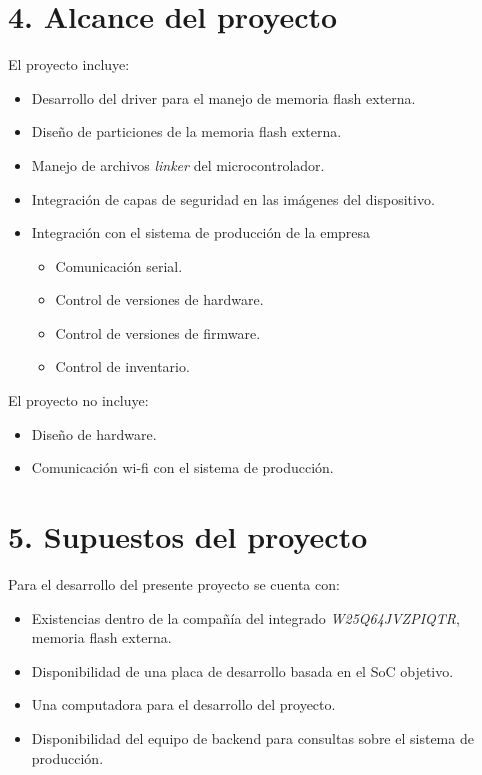 \documentclass[
11pt, %
]{charter}
\begin{document}
\section{4. Alcance del proyecto}
\label{sec:alcance}

El proyecto incluye:
\begin{itemize}
	\item Desarrollo del driver para el manejo de memoria flash externa.
	\item Diseño de particiones de la memoria flash externa.
	\item Manejo de archivos \textit{linker} del microcontrolador.
	\item Integración de capas de seguridad en las imágenes del dispositivo.
	\item Integración con el sistema de producción de la empresa
		\begin{itemize}
		\item Comunicación serial.
		\item Control de versiones de hardware.
		\item Control de versiones de firmware.
		\item Control de inventario.
		\end{itemize}	
\end{itemize}

El proyecto no incluye:
\begin{itemize}
	\item Diseño de hardware.
	\item Comunicación wi-fi con el sistema de producción.
\end{itemize}

\section{5. Supuestos del proyecto}
\label{sec:supuestos}

Para el desarrollo del presente proyecto se cuenta con:

\begin{itemize}
	\item Existencias dentro de la compañía del integrado \textit{W25Q64JVZPIQTR}, memoria flash externa.
	\item Disponibilidad de una placa de desarrollo basada en el SoC objetivo.
	\item Una computadora para el desarrollo del proyecto.
	\item Disponibilidad del equipo de backend para consultas sobre el sistema de producción.
\end{itemize}
\end{document}
